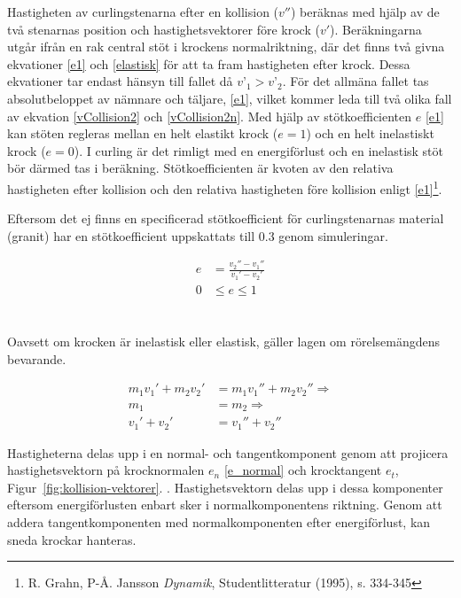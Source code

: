 \documentclass[11pt]{article} %
\begin{document}
Hastigheten av curlingstenarna efter en kollision ($v''$) beräknas med hjälp av de två stenarnas position och hastighetsvektorer före krock ($v'$).
Beräkningarna utgår ifrån en rak central stöt i krockens normalriktning, där det finns två givna ekvationer \eqref{e1} och \eqref{elastisk} för att ta fram hastigheten efter krock.  Dessa ekvationer tar endast hänsyn till fallet då $v’_1 > v’_2$. 
För det allmäna fallet tas absolutbeloppet av nämnare och täljare, \eqref{e1}, vilket kommer leda till två olika fall av ekvation \eqref{vCollision2}  och \eqref{vCollision2n}. 
Med hjälp av stötkoefficienten $e$ \eqref{e1} kan stöten regleras mellan en helt elastikt krock ($e=1$) och en helt inelastiskt krock ($e=0$). 
I curling är det rimligt med en energiförlust och en inelastisk stöt bör därmed tas i beräkning. 
Stötkoefficienten är kvoten av den relativa hastigheten efter kollision och den relativa hastigheten före kollision enligt \eqref{e1}\footnote{R. Grahn, P-Å. Jansson \emph{Dynamik}, Studentlitteratur (1995), s. 334-345}.

Eftersom det ej finns en specificerad stötkoefficient för curlingstenarnas material (granit) har en stötkoefficient uppskattats till 0.3 genom simuleringar.  

 \begin{subequations}\label{e1}
 \begin{align}
 e& = \frac{v_2''-v_1''}{v_1'-v_2'}\\
0& \le e \le 1
 \end{align}
 \end{subequations}
\\\\Oavsett om krocken är inelastisk eller elastisk, gäller lagen om rörelsemängdens bevarande.

 \begin{subequations}\label{elastisk}
 \begin{align}
m_1 v_1' + m_2 v_2'& = m_1 v_1'' + m_2 v_2'' \Rightarrow\\
m_1& = m_2 \Rightarrow\\
v_1' + v_2'& = v_1'' + v_2'' \label{momentum}
 \end{align}
 \end{subequations}


Hastigheterna delas upp i en normal- och tangentkomponent genom att projicera hastighetsvektorn på krocknormalen $e_n$ \eqref{e_normal} och krocktangent $e_t$,  Figur~\ref{fig:kollision-vektorer}. . 
Hastighetsvektorn delas upp i dessa komponenter eftersom energiförlusten enbart sker i normalkomponentens riktning. 
Genom att addera tangentkomponenten med normalkomponenten efter energiförlust, kan sneda krockar hanteras.
\end{document}
